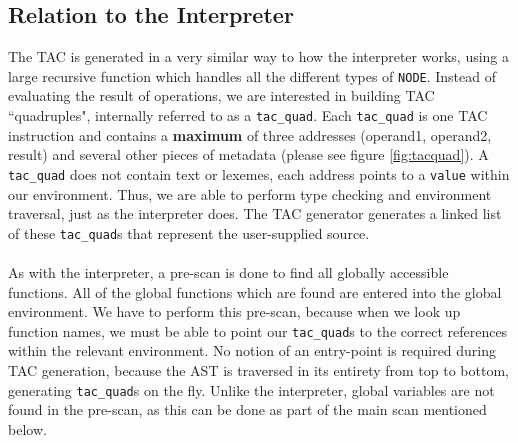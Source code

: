 \subsection{Relation to the Interpreter}
The TAC is generated in a very similar way to how the interpreter works, using a large recursive function which handles all the different types of \verb!NODE!. Instead of evaluating the result of operations, we are interested in building TAC ``quadruples", internally referred to as a \verb!tac_quad!. Each \verb!tac_quad! is one TAC instruction and contains a \textbf{maximum} of three addresses (operand1, operand2, result) and several other pieces of metadata (please see figure \ref{fig:tacquad}). A \verb!tac_quad! does not contain text or lexemes, each address points to a \verb!value! within our environment. Thus, we are able to perform type checking and environment traversal, just as the interpreter does. The TAC generator generates a linked list of these \verb!tac_quad!s that represent the user-supplied \mmc source.
\ \\ \ \\
As with the interpreter, a pre-scan is done to find all globally accessible functions. All of the global functions which are found are entered into the global environment. We have to perform this pre-scan, because when we look up function names, we must be able to point our \verb!tac_quad!s to the correct references within the relevant environment. No notion of an entry-point is required during TAC generation, because the AST is traversed in its entirety from top to bottom, generating \verb!tac_quad!s on the fly. Unlike the interpreter, global variables are not found in the pre-scan, as this can be done as part of the main scan mentioned below.

